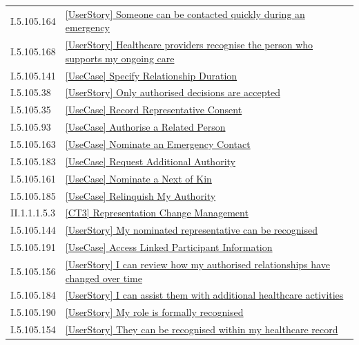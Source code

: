 \begin{longtable}{p{.22\linewidth}p{.73\linewidth}}
I.5.105.164 & \hyperref[element:a742ee8c07b64b82829b36c6ca8e74e6]{[UserStory] Someone can be contacted quickly during an emergency} \\
I.5.105.168 & \hyperref[element:a8c1126b667e4447b37fc50bf9a2cc2c]{[UserStory] Healthcare providers recognise the person who supports my ongoing care} \\
I.5.105.141 & \hyperref[element:add2450c52e2409e942d50bc96b52330]{[UseCase] Specify Relationship Duration} \\
I.5.105.38 & \hyperref[element:b19437ab28c04965ae2d9495449b7afa]{[UserStory] Only authorised decisions are accepted} \\
I.5.105.35 & \hyperref[element:b2a0dc71774745d593e2c686eca71bac]{[UseCase] Record Representative Consent} \\
I.5.105.93 & \hyperref[element:b72bdaa9caec4c24b4746fa3f1c4752d]{[UseCase] Authorise a Related Person} \\
I.5.105.163 & \hyperref[element:b7db667997cf47e087af8ac4773c9217]{[UseCase] Nominate an Emergency Contact} \\
I.5.105.183 & \hyperref[element:bb6f235901db40faacaafd0b309179c8]{[UseCase] Request Additional Authority} \\
I.5.105.161 & \hyperref[element:bcfe55c728924f92b32e2df9b050f50c]{[UseCase] Nominate a Next of Kin} \\
I.5.105.185 & \hyperref[element:c065c658f19d49129ba5b28b24f0b93e]{[UseCase] Relinquish My Authority} \\
II.1.1.1.5.3 & \hyperref[element:c0fd7cbd9b814eb284139ecc01f5dc20]{[CT3] Representation Change Management} \\
I.5.105.144 & \hyperref[element:c2b9f702074042a5ae7f75622b71ffdb]{[UserStory] My nominated representative can be recognised} \\
I.5.105.191 & \hyperref[element:c7a180a259a44e6e95faa1f46935e703]{[UseCase] Access Linked Participant Information} \\
I.5.105.156 & \hyperref[element:c8d2a2ea9bd24a8d9840e9143071699e]{[UserStory] I can review how my authorised relationships have changed over time} \\
I.5.105.184 & \hyperref[element:cc6a8268f1ba4686b75cbbae5f574704]{[UserStory] I can assist them with additional healthcare activities} \\
I.5.105.190 & \hyperref[element:cd7f2782684c46f6818e1c5838ab535d]{[UserStory] My role is formally recognised} \\
I.5.105.154 & \hyperref[element:cff4019280de46e3a6749279eb063127]{[UserStory] They can be recognised within my healthcare record} \\

\end{longtable}
